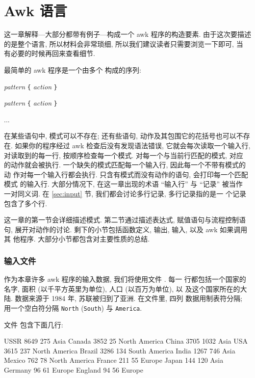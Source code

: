 
\chapter{Awk 语言}
\label{chap:the_awk_language}

这一章解释---大部分都带有例子---构成一个 awk 程序的构造要素. 由于这次要描述
的是整个语言, 所以材料会非常琐细, 所以我们建议读者只需要浏览一下即可, 当
有必要的时候再回来查看细节.

最简单的 awk 程序是一个由多个 \patact 构成的序列:
\begin{pattern}
\textit{pattern} \texttt{\{} \textit{action} \texttt{\}} \par
\textit{pattern} \texttt{\{} \textit{action} \texttt{\}} \par
...
\end{pattern}
在某些语句中, 模式可以不存在; 还有些语句, 动作及其包围它的花括号也可以不存
在. 如果你的程序经过 awk 检查后没有发现语法错误, 它就会每次读取一个输入行,
对读取到的每一行, 按顺序检查每一个模式. 对每一个与当前行匹配的模式, 对应
的动作就会被执行. 一个缺失的模式匹配每一个输入行, 因此每一个不带有模式的动
作对每一个输入行都会执行. 只含有模式而没有动作的语句, 会打印每一个匹配模式
的输入行. 大部分情况下, 在这一章出现的术语 ``输入行'' 与 ``记录'' 被当作
一对同义词. 在 \ref{sec:input} 节, 我们都会讨论多行记录, 多行记录指的是一
个记录包含了多个行.

这一章的第一节会详细描述模式. 第二节通过描述表达式, 赋值语句与流程控制语句,
展开对动作的讨论. 剩下的小节包括函数定义, 输出, 输入, 以及 awk 如果调用其
他程序. 大部分小节都包含对主要性质的总结.

\subsection{输入文件}
\label{subsec:the_input_file_countries}

作为本章许多 awk 程序的输入数据, 我们将使用文件 . 每一
行都包括一个国家的名字, 面积 (以千平方英里为单位), 人口 (以百万为单位), 以
及这个国家所在的大陆. 数据来源于 1984 年, 苏联被归到了亚洲. 在文件里, 四列
数据用制表符分隔; 用一个空白符分隔 \texttt{North} (\texttt{South}) 与
\texttt{America}.

文件  包含下面几行:
\begin{file}
    USSR        8649    275     Asia
    Canada      3852    25      North America
    China       3705    1032    Asia
    USA         3615    237     North America
    Brazil      3286    134     South America
    India       1267    746     Asia
    Mexico      762     78      North America
    France      211     55      Europe
    Japan       144     120     Asia
    Germany     96      61      Europe
    England     94      56      Europe
\end{file}

